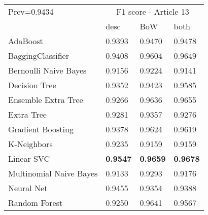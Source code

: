 \begin{tabular}{|l|l|l|l| }
\hline
Prev=0.9434 &  \multicolumn{3}{c|}{F1 score - Article 13} \\
\cline{2-4} & desc & BoW & both \\ \hline
AdaBoost                & 0.9393 & 0.9470 & 0.9478\\
BaggingClassifier       & 0.9408 & 0.9604 & 0.9649\\
Bernoulli Naive Bayes   & 0.9156 & 0.9224 & 0.9141\\
Decision Tree           & 0.9352 & 0.9423 & 0.9585\\
Ensemble Extra Tree     & 0.9266 & 0.9636 & 0.9655\\
Extra Tree              & 0.9281 & 0.9357 & 0.9276\\
Gradient Boosting       & 0.9378 & 0.9624 & 0.9619\\
K-Neighbors             & 0.9235 & 0.9159 & 0.9159\\
Linear SVC              & {\bf 0.9547} & {\bf 0.9659} & {\bf 0.9678}\\
Multinomial Naive Bayes & 0.9133 & 0.9293 & 0.9176\\
Neural Net              & 0.9455 & 0.9354 & 0.9388\\
Random Forest           & 0.9250 & 0.9641 & 0.9567\\
\hline
\end{tabular}